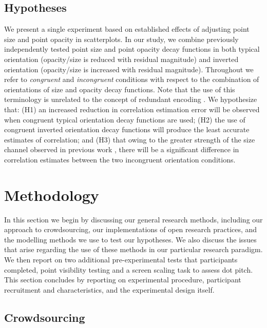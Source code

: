 \documentclass[manuscript, review, anonymous, screen]{acmart}
\begin{document}
\hypertarget{hypotheses}{%
\subsection{Hypotheses}\label{hypotheses}}

We present a single experiment based on established effects of adjusting
point size and point opacity in scatterplots. In our study, we combine
previously independently tested point size and point opacity decay
functions in both typical orientation (opacity/size is reduced with
residual magnitude) and inverted orientation (opacity/size is increased
with residual magnitude). Throughout we refer to \emph{congruent} and
\emph{incongruent} conditions with respect to the combination of
orientations of size and opacity decay functions. Note that the use of
this terminology is unrelated to the concept of redundant encoding
\citep{nothelfer_2017}. We hypothesize that: (H1) an increased reduction
in correlation estimation error will be observed when congruent typical
orientation decay functions are used; (H2) the use of congruent inverted
orientation decay functions will produce the least accurate estimates of
correlation; and (H3) that owing to the greater strength of the size
channel observed in previous work \citep{strain_2023b}, there will be a
significant difference in correlation estimates between the two
incongruent orientation conditions.

\hypertarget{sec-methods}{%
\section{Methodology}\label{sec-methods}}

In this section we begin by discussing our general research methods,
including our approach to crowdsourcing, our implementations of open
research practices, and the modelling methods we use to test our
hypotheses. We also discuss the issues that arise regarding the use of
these methods in our particular research paradigm. We then report on two
additional pre-experimental tests that participants completed, point
visibility testing and a screen scaling task to assess dot pitch. This
section concludes by reporting on experimental procedure, participant
recruitment and characteristics, and the experimental design itself.

\hypertarget{sec-crowdsourcing}{%
\subsection{Crowdsourcing}\label{sec-crowdsourcing}}
\end{document}
